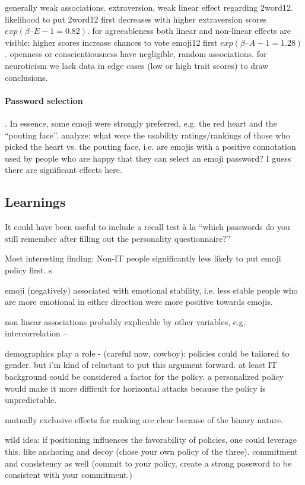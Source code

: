 generally weak associations.
extraversion, weak linear effect regarding 2word12. likelihood to put 2word12 first decreases with higher extraversion scores $exp(\beta–{E-1}=0.82)$. for agreeableness both linear and non-linear effects are visible; higher scores increase chances to vote emoji12 first $exp(\beta–{A-1}=1.28)$. openness or conscientiousness have negligible, random associations. for neuroticism we lack data in edge cases (low or high trait scores) to draw conclusions. %


\paragraph{Password selection}

. In essence, some emoji were strongly preferred, e.g. the red heart and the ``pouting face''. analyze: what were the usability ratings/rankings of those who picked the heart vs. the pouting face, i.e. are emojis with a positive connotation used by people who are happy that they can select an emoji password? I guess there are significant effects here. 

\subsection{Learnings}
It could have been useful to include a recall test à la ``which passwords do you still remember after filling out the personality questionnaire?'' 

Most interesting finding: Non-IT people significantly less likely to put emoji policy first. s

emoji (negatively) associated with emotional stability, i.e. less stable people who are more emotional in either direction were more positive towards emojis.

non linear associations probably explicable by other variables, e.g. intercorrelation -- 

demographics play a role - (careful now, cowboy): policies could be tailored to gender. but i'm kind of reluctant to put this argument forward. at least IT background could be considered a factor for the policy. a personalized policy would make it more difficult for horizontal attacks because the policy is unpredictable.

mutually exclusive effects for ranking are clear because of the binary nature.

wild idea: if positioning influences the favorability of policies, one could leverage this. like anchoring and decoy (chose your own policy of the three). commitment and consistency as well (commit to your policy, create a strong password to be consistent with your commitment.)
